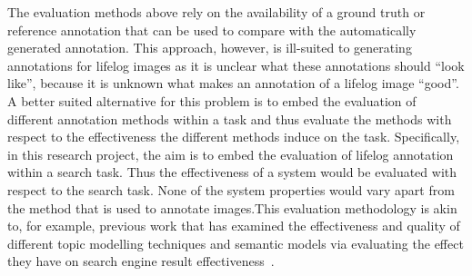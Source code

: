 The evaluation methods above rely on the availability of a ground truth or reference annotation that can be used to compare with the automatically generated annotation. This approach, however, is ill-suited to generating annotations for lifelog images as it is unclear what these annotations should ``look like'', because it is unknown what makes an annotation of a lifelog image ``good''. A better suited alternative for this problem is to embed the evaluation of different annotation methods within a task and thus evaluate the  methods with respect to the effectiveness the different methods induce on the task. Specifically, in this research project, the aim is to embed the evaluation of lifelog annotation within a search task. Thus the effectiveness of a system would be evaluated with respect to the search task. None of the system properties would vary apart from the method that is used to annotate images.This evaluation methodology is akin to, for example, previous work that has examined the effectiveness and quality of different topic modelling techniques and semantic models via evaluating the effect they have on search engine result effectiveness~\cite{wei2006lda,zuccon2015integrating,karimzadehgan2010estimation,yi2009comparative}.

